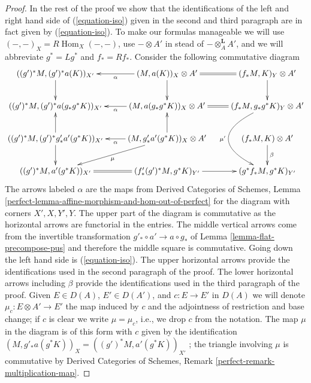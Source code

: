 \documentclass{stacks-project}
\theoremstyle{plain}
\theoremstyle{definition}
\theoremstyle{remark}
\numberwithin{equation}{subsection}
\def\Hom{\mathop{\mathrm{Hom}}\nolimits}
\begin{document}
\begin{proof}
\medskip\noindent
In the rest of the proof we show that the identifications of
the left and right hand side of (\ref{equation-iso})
given in the second and third paragraph are in fact given by
(\ref{equation-iso}). To make our formulas manageable
we will use $(-, -)_X = R\Hom_X(-, -)$, use $- \otimes A'$
in stead of $- \otimes_A^\mathbf{L} A'$, and we will abbreviate
$g^* = Lg^*$ and $f_* = Rf_*$. Consider the following
commutative diagram
$$
\xymatrix{
((g')^*M, (g')^*a(K))_{X'} \ar[d] &
(M, a(K))_X \otimes A' \ar[l]^-\alpha \ar[d] &
(f_*M, K)_Y \otimes A' \ar@{=}[l] \ar[d] \\
((g')^*M, (g')^*a(g_*g^*K))_{X'} &
(M, a(g_*g^*K))_X \otimes A' \ar[l]^-\alpha &
(f_*M, g_*g^*K)_Y \otimes A' \ar@{=}[l] \ar@/_4pc/[dd]_{\mu'} \\
((g')^*M, (g')^*g'_*a'(g^*K))_{X'} \ar[u] \ar[d] &
(M, g'_*a'(g^*K))_X \otimes A' \ar[u] \ar[l]^-\alpha \ar[ld]^\mu &
(f_*M, K) \otimes A' \ar[d]^\beta \\
((g')^*M, a'(g^*K))_{X'} &
(f'_*(g')^*M, g^*K)_{Y'} \ar@{=}[l] \ar[r] &
(g^*f_*M, g^*K)_{Y'}
}
$$
The arrows labeled $\alpha$ are the maps from
Derived Categories of Schemes, Lemma
\ref{perfect-lemma-affine-morphism-and-hom-out-of-perfect}
for the diagram with corners $X', X, Y', Y$.
The upper part of the diagram is commutative as the horizontal arrows are
functorial in the entries.
The middle vertical arrows come from the invertible transformation
$g'_* \circ a' \to a \circ g_*$  of Lemma \ref{lemma-flat-precompose-pus}
and therefore the middle square is commutative.
Going down the left hand side is (\ref{equation-iso}).
The upper horizontal arrows provide the identifications used in the
second paragraph of the proof.
The lower horizontal arrows including $\beta$ provide the identifications
used in the third paragraph of the proof. Given $E \in D(A)$,
$E' \in D(A')$, and $c : E \to E'$ in $D(A)$ we will denote
$\mu_c : E \otimes A' \to E'$ the map induced by $c$
and the adjointness of restriction and base change;
if $c$ is clear we write $\mu = \mu_c$, i.e., we
drop $c$ from the notation. The map $\mu$ in the diagram is of this
form with $c$ given by the identification
$(M, g'_*a(g^*K))_X = ((g')^*M, a'(g^*K))_{X'}$
; the triangle involving $\mu$ is commutative by
Derived Categories of Schemes, Remark \ref{perfect-remark-multiplication-map}.


\end{proof}
\end{document}
